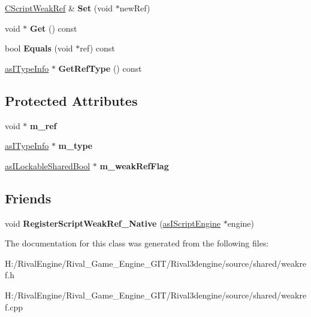 \begin{DoxyCompactItemize}
\hyperlink{class_c_script_weak_ref}{C\+Script\+Weak\+Ref} \& {\bfseries Set} (void $\ast$new\+Ref)
\item 
\mbox{\label{class_c_script_weak_ref_a781a4f766763433b8f5210986e48380f}} 
void $\ast$ {\bfseries Get} () const
\item 
\mbox{\label{class_c_script_weak_ref_a0c5e777fc2b6065289b59f92090ac0e4}} 
bool {\bfseries Equals} (void $\ast$ref) const
\item 
\mbox{\label{class_c_script_weak_ref_ac23615087f8680a3c3764c92494d9588}} 
\hyperlink{classas_i_type_info}{as\+I\+Type\+Info} $\ast$ {\bfseries Get\+Ref\+Type} () const
\end{DoxyCompactItemize}
\subsection*{Protected Attributes}
\begin{DoxyCompactItemize}
\item 
\mbox{\label{class_c_script_weak_ref_a797f3b79f95476b4114eeaee553d2587}} 
void $\ast$ {\bfseries m\+\_\+ref}
\item 
\mbox{\label{class_c_script_weak_ref_aeea649f6d9578f77ade7e6b8700e856c}} 
\hyperlink{classas_i_type_info}{as\+I\+Type\+Info} $\ast$ {\bfseries m\+\_\+type}
\item 
\mbox{\label{class_c_script_weak_ref_a7efe7677d02265cf2d0e3c9d0b9a623d}} 
\hyperlink{classas_i_lockable_shared_bool}{as\+I\+Lockable\+Shared\+Bool} $\ast$ {\bfseries m\+\_\+weak\+Ref\+Flag}
\end{DoxyCompactItemize}
\subsection*{Friends}
\begin{DoxyCompactItemize}
\item 
\mbox{\label{class_c_script_weak_ref_a17cea9256a54fca5f35e21c8745f4718}} 
void {\bfseries Register\+Script\+Weak\+Ref\+\_\+\+Native} (\hyperlink{classas_i_script_engine}{as\+I\+Script\+Engine} $\ast$engine)
\end{DoxyCompactItemize}


The documentation for this class was generated from the following files\+:\begin{DoxyCompactItemize}
\item 
H\+:/\+Rival\+Engine/\+Rival\+\_\+\+Game\+\_\+\+Engine\+\_\+\+G\+I\+T/\+Rival3dengine/source/shared/weakref.\+h\item 
H\+:/\+Rival\+Engine/\+Rival\+\_\+\+Game\+\_\+\+Engine\+\_\+\+G\+I\+T/\+Rival3dengine/source/shared/weakref.\+cpp\end{DoxyCompactItemize}
